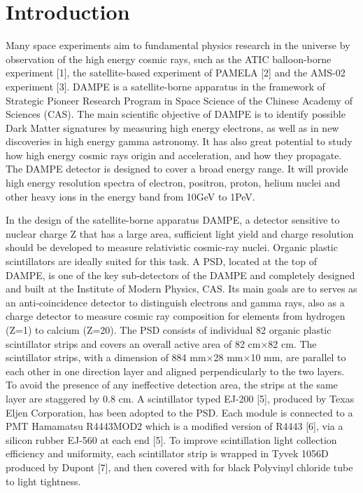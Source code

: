 \documentclass[5p, times]{elsarticle}
\begin{document}
\linenumbers
\section{Introduction}
\label{sec:introduction}

Many space experiments aim to fundamental physics research in the universe by observation of the high energy cosmic
rays, such as the ATIC balloon-borne experiment [1], the satellite-based experiment of PAMELA [2] and the AMS-02
experiment [3]. DAMPE is a satellite-borne apparatus in the framework of Strategic Pioneer Research Program in Space
Science of the Chinese Academy of Sciences (CAS). The main scientific objective of DAMPE is to identify possible Dark
Matter signatures by measuring high energy electrons, as well as in new discoveries in high energy gamma astronomy. It
has also great potential to study how high energy cosmic rays origin and acceleration, and how they propagate. The
DAMPE detector is designed to cover a broad energy range. It will provide high energy resolution spectra
of electron, positron, proton, helium nuclei and other heavy ions in the energy band from 10GeV to 1PeV.

In the design of the satellite-borne apparatus DAMPE, a detector sensitive to nuclear charge Z that has a large area,
sufficient light yield and charge resolution should be developed to measure relativistic cosmic-ray nuclei. Organic
plastic scintillators are ideally suited for this task. A PSD, located at the top of DAMPE, is one of the key
sub-detectors of the DAMPE and completely designed and built at the Institute of Modern Physics, CAS. Its main goals
are to serves as an anti-coincidence detector to distinguish electrons and gamma rays, also as a charge detector to
measure cosmic ray composition for elements from hydrogen (Z=1) to calcium (Z=20). The PSD consists of individual 82
organic plastic scintillator strips and covers an overall active area of 82 cm×82 cm. The scintillator strips, with a
dimension of 884 mm×28 mm×10 mm, are parallel to each other in one direction layer and aligned perpendicularly to the
two layers. To avoid the presence of any ineffective detection area, the strips at the same layer are staggered by 0.8
cm. A scintillator typed EJ-200 [5], produced by Texas Eljen Corporation, has been adopted to the PSD. Each module is
connected to a PMT Hamamatsu R4443MOD2 which is a modified version of R4443 [6], via a silicon rubber EJ-560 at each
end [5]. To improve scintillation light collection efficiency and uniformity, each scintillator strip is wrapped in
Tyvek 1056D produced by Dupont [7], and then covered with for black Polyvinyl chloride tube to light tightness. 
\end{document}
